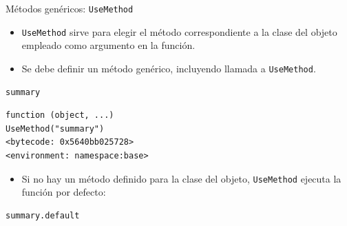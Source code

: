 \documentclass[xcolor={usenames,svgnames,dvipsnames}]{beamer}
\begin{document}
\begin{frame}[fragile,label={sec:org3d860a1}]{Métodos genéricos: \texttt{UseMethod}}
 \begin{itemize}
\item \texttt{UseMethod} sirve para elegir el método correspondiente a la clase
del objeto empleado como argumento en la función.

\item Se debe definir un método genérico, incluyendo llamada a
\texttt{UseMethod}.
\end{itemize}
\lstset{language=r,label= ,caption= ,captionpos=b,numbers=none}
\begin{lstlisting}
summary
\end{lstlisting}

\begin{verbatim}
function (object, ...) 
UseMethod("summary")
<bytecode: 0x5640bb025728>
<environment: namespace:base>
\end{verbatim}

\begin{itemize}
\item Si no hay un método definido para la clase del objeto, \texttt{UseMethod} ejecuta la función por defecto:
\end{itemize}
\lstset{language=r,label= ,caption= ,captionpos=b,numbers=none}
\begin{lstlisting}
summary.default
\end{lstlisting}


\end{frame}
\end{document}
